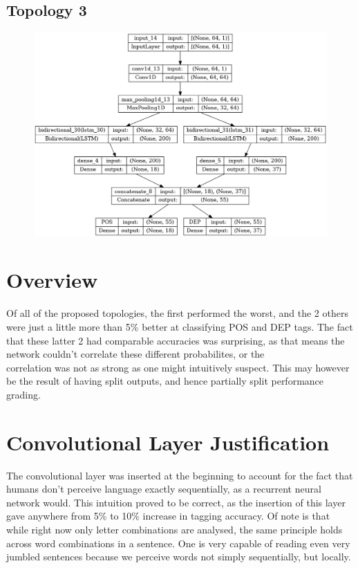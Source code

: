     \subsection{Topology 3}
    \begin{figure}[h!]
        \centering
        \includegraphics[width=\linewidth]{TOPO/TOPO_1.png}
    \end{figure}
    \section{Overview}
    Of all of the proposed topologies, the first performed the worst, and the 2 others were just a little more than 5\% better at classifying POS and DEP tags.
    The fact that these latter 2 had comparable accuracies was surprising, as that means the network couldn't correlate these different probabilites, or the \\
    correlation was not as strong as one might intuitively suspect. This may however be the result of having split outputs, and hence partially split 
    performance grading.

\section{Convolutional Layer Justification}
The convolutional layer was inserted at the beginning to account for the fact that humans don't perceive language exactly sequentially, as a recurrent neural 
network would. This intuition proved to be correct, as the insertion of this layer gave anywhere from 5\% to 10\% increase in tagging accuracy. Of note is that
while right now only letter combinations are analysed, the same principle holds across word combinations in a sentence. One is very capable of reading even very
jumbled sentences because we perceive words not simply sequentially, but locally.


